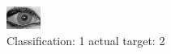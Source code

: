 \begin{figure}[h!]
\begin{center}
\includegraphics[width=0.60\columnwidth]{figures/ID2013_class_1_target_2.png}
\end{center}
\caption{ Classification: 1 actual target: 2}
\label{fig:ID2013_class_1_target_2}
\end{figure}
